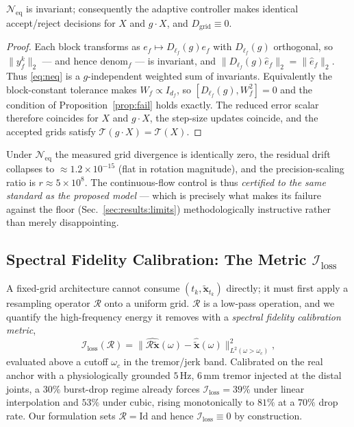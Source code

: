 \begin{proposition}
\label{prop:neq}
$\mathcal{N}_{\text{eq}}$ is invariant; consequently the adaptive controller makes identical
accept/reject decisions for $X$ and $g\cdot X$, and $D_{\text{grid}}\equiv0$.
\end{proposition}
\begin{proof}
Each block transforms as $e_f\mapsto D_{\ell_f}(g)e_f$ with $D_{\ell_f}(g)$ orthogonal, so
$\|y^k_f\|_2$ --- and hence $\mathrm{denom}_f$ --- is invariant, and
$\|D_{\ell_f}(g)\hat e_f\|_2=\|\hat e_f\|_2$. Thus \eqref{eq:neq} is a $g$-independent weighted sum of
invariants. Equivalently the block-constant tolerance makes $W_f\propto I_{d_f}$, so
$[D_{\ell_f}(g),W_f^2]=0$ and the condition of Proposition~\ref{prop:fail} holds exactly. The reduced
error scalar therefore coincides for $X$ and $g\cdot X$, the step-size updates coincide, and the
accepted grids satisfy $\mathcal{T}(g\cdot X)=\mathcal{T}(X)$.
\end{proof}
%
Under $\mathcal{N}_{\text{eq}}$ the measured grid divergence is identically zero, the residual drift
collapses to $\approx1.2\times10^{-15}$ (flat in rotation magnitude), and the precision-scaling ratio
is $r\approx5\times10^{8}$. The continuous-flow control is thus \emph{certified to the same standard
as the proposed model} --- which is precisely what makes its failure against the floor
(Sec.~\ref{sec:results:limits}) methodologically instructive rather than merely disappointing.

\subsection{Spectral Fidelity Calibration: The Metric $\mathcal{I}_{\text{loss}}$}
\label{sec:method:spectral}

A fixed-grid architecture cannot consume $(t_k,\tilde{\bm{x}}_{t_k})$ directly; it must first apply a
resampling operator $\mathcal{R}$ onto a uniform grid. $\mathcal{R}$ is a low-pass operation, and we
quantify the high-frequency energy it removes with a \emph{spectral fidelity calibration metric},
%
\begin{equation}
\label{eq:iloss}
\mathcal{I}_{\text{loss}}(\mathcal{R})
=\big\|\widehat{\mathcal{R}\tilde{\bm{x}}}(\omega)-\widehat{\tilde{\bm{x}}}(\omega)\big\|^2_{L^2(\omega>\omega_c)} ,
\end{equation}
%
evaluated above a cutoff $\omega_c$ in the tremor/jerk band. Calibrated on the real anchor with a
physiologically grounded $5\,\mathrm{Hz}$, $6\,\mathrm{mm}$ tremor injected at the distal joints, a
$30\%$ burst-drop regime already forces $\mathcal{I}_{\text{loss}}=39\%$ under linear interpolation
and $53\%$ under cubic, rising monotonically to $81\%$ at a $70\%$ drop rate. Our formulation sets
$\mathcal{R}=\mathrm{Id}$ and hence $\mathcal{I}_{\text{loss}}\equiv0$ by construction.


